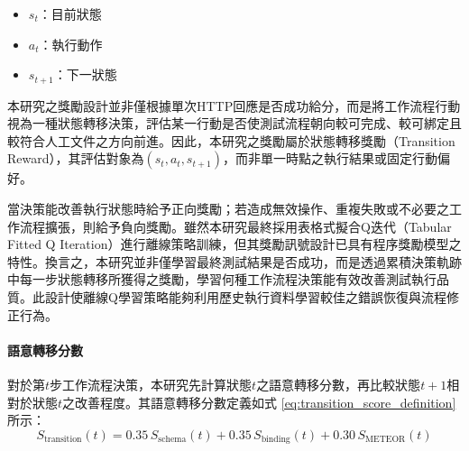 \begin{ZhChapter}
\begin{itemize}
\item $s_t$：目前狀態
\item $a_t$：執行動作
\item $s_{t+1}$：下一狀態
\end{itemize}

\text 本研究之獎勵設計並非僅根據單次HTTP回應是否成功給分，而是將工作流程行動視為一種狀態轉移決策，評估某一行動是否使測試流程朝向較可完成、較可綁定且較符合人工文件之方向前進。因此，本研究之獎勵屬於狀態轉移獎勵（Transition Reward），其評估對象為$(s_t, a_t, s_{t+1})$，而非單一時點之執行結果或固定行動偏好。

\text 當決策能改善執行狀態時給予正向獎勵；若造成無效操作、重複失敗或不必要之工作流程擴張，則給予負向獎勵。雖然本研究最終採用表格式擬合Q迭代（Tabular Fitted Q Iteration）進行離線策略訓練，但其獎勵訊號設計已具有程序獎勵模型之特性。換言之，本研究並非僅學習最終測試結果是否成功，而是透過累積決策軌跡中每一步狀態轉移所獲得之獎勵，學習何種工作流程決策能有效改善測試執行品質。此設計使離線Q學習策略能夠利用歷史執行資料學習較佳之錯誤恢復與流程修正行為。
\paragraph{語意轉移分數}
\text 對於第$t$步工作流程決策，本研究先計算狀態$t$之語意轉移分數，再比較狀態$t+1$相對於狀態$t$之改善程度。其語意轉移分數定義如式 \eqref{eq:transition_score_definition} 所示：
\begin{equation}
\label{eq:transition_score_definition}
S_{\text{transition}}(t)=0.35\,S_{\text{schema}}(t)+0.35\,S_{\text{binding}}(t)+0.30\,S_{\text{METEOR}}(t)
\end{equation}


\end{ZhChapter}
